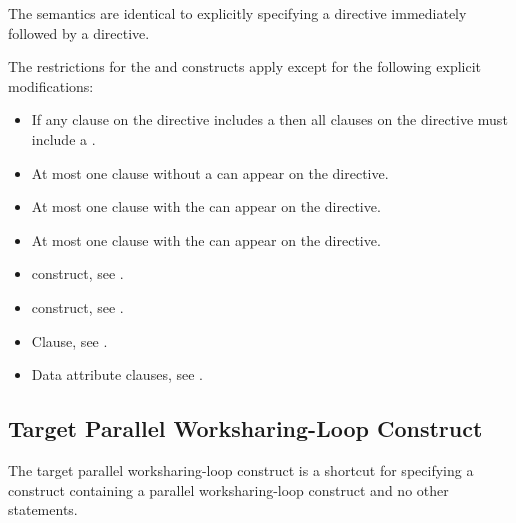 \descr
The semantics are identical to explicitly specifying a  directive
immediately followed by a  directive.

\restrictions

The restrictions for the  and  constructs apply 
except for the following explicit modifications:

\begin{itemize}
\item If any  clause on the directive includes a
       then all  clauses
      on the directive must include a .
\item At most one  clause without a
       can appear on the directive.
\item At most one  clause with the 
       can appear on the directive.
\item At most one  clause with the 
       can appear on the directive.
\end{itemize}

\crossreferences
\begin{itemize}
\item {} construct, see
.

\item {} construct, see
.

\item {} Clause, see .

\item Data attribute clauses, see
.
\end{itemize}



\subsection{Target Parallel Worksharing-Loop Construct}
\label{subsec:Target Parallel Worksharing-Loop Construct}
\summary
The target parallel worksharing-loop construct is a shortcut for specifying 
a  construct containing a parallel worksharing-loop construct 
and no other statements.

